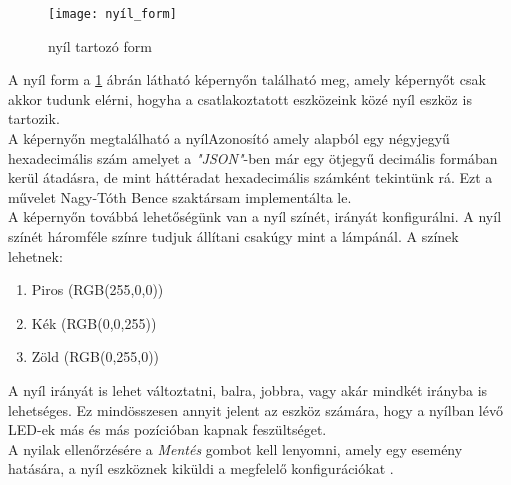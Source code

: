 \documentclass[tocnopagenum]{thesis-ekf}
\theoremstyle{definition}
\theoremstyle{remark}
\begin{document}
	\begin{figure}[h!]	
		\centering
		\texttt{[image: nyíl\_form]}
		\caption[nyil form]{nyíl tartozó form}
		\label{fig:nyilform}
	\end{figure}
	A nyíl form a \ref{fig:nyilform} ábrán látható képernyőn található meg, amely képernyőt csak akkor tudunk elérni, hogyha a csatlakoztatott eszközeink közé nyíl eszköz is tartozik.
	\\
	A képernyőn megtalálható a nyílAzonosító amely alapból egy négyjegyű hexadecimális szám amelyet a \textit{"JSON"}-ben már egy ötjegyű decimális formában kerül átadásra, de mint háttéradat hexadecimális számként tekintünk rá. Ezt a művelet Nagy-Tóth Bence szaktársam implementálta le. 
	\\
	A képernyőn továbbá lehetőségünk van a nyíl színét, irányát konfigurálni. A nyíl színét háromféle színre tudjuk állítani csakúgy mint a lámpánál.
	 A színek lehetnek:
	\begin{enumerate}
		\centering
		\item Piros (RGB(255,0,0))
		\item Kék (RGB(0,0,255))
		\item Zöld (RGB(0,255,0))
	\end{enumerate} 

	A nyíl irányát is lehet változtatni, balra, jobbra, vagy akár mindkét irányba is lehetséges. Ez mindösszesen annyit jelent az eszköz számára, hogy a nyílban lévő LED-ek más és más pozícióban kapnak feszültséget.
	\\
	A nyilak ellenőrzésére a \textit{Mentés} gombot kell lenyomni, amely egy esemény hatására, a nyíl eszköznek kiküldi a megfelelő konfigurációkat .
	

\end{document}

